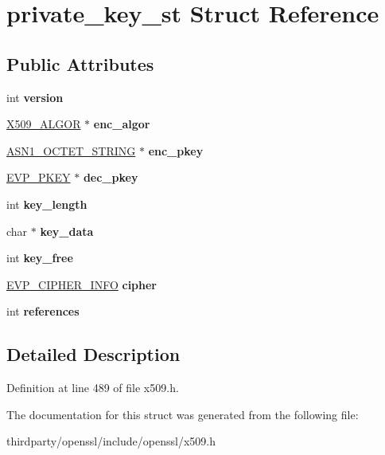 \hypertarget{structprivate__key__st}{}\section{private\+\_\+key\+\_\+st Struct Reference}
\label{structprivate__key__st}
\subsection*{Public Attributes}
\begin{DoxyCompactItemize}
\item 
\mbox{\label{structprivate__key__st_a16bd44f055e649572a0f5b0d62a92219}} 
int {\bfseries version}
\item 
\mbox{\label{structprivate__key__st_a866f6478e044bb225e3c9983df4b48a2}} 
\hyperlink{struct_x509__algor__st}{X509\+\_\+\+A\+L\+G\+OR} $\ast$ {\bfseries enc\+\_\+algor}
\item 
\mbox{\label{structprivate__key__st_a514cc301684203bf755bbc83033f51aa}} 
\hyperlink{structasn1__string__st}{A\+S\+N1\+\_\+\+O\+C\+T\+E\+T\+\_\+\+S\+T\+R\+I\+NG} $\ast$ {\bfseries enc\+\_\+pkey}
\item 
\mbox{\label{structprivate__key__st_ab6fa39f8beba82366b4a0c9af1d68231}} 
\hyperlink{structevp__pkey__st}{E\+V\+P\+\_\+\+P\+K\+EY} $\ast$ {\bfseries dec\+\_\+pkey}
\item 
\mbox{\label{structprivate__key__st_a4fd59ffeb31b0bc4acf1330ba4c1cfab}} 
int {\bfseries key\+\_\+length}
\item 
\mbox{\label{structprivate__key__st_a648ff8dfa3759f8cf7e78e8f0acf621e}} 
char $\ast$ {\bfseries key\+\_\+data}
\item 
\mbox{\label{structprivate__key__st_a6cba7d7973cf8425493d996dd8464e29}} 
int {\bfseries key\+\_\+free}
\item 
\mbox{\label{structprivate__key__st_afeef179b98e87f1f950eb977dda61fc4}} 
\hyperlink{structevp__cipher__info__st}{E\+V\+P\+\_\+\+C\+I\+P\+H\+E\+R\+\_\+\+I\+N\+FO} {\bfseries cipher}
\item 
\mbox{\label{structprivate__key__st_a96a0fec0281fed6acf1d455f2d5c93ff}} 
int {\bfseries references}
\end{DoxyCompactItemize}


\subsection{Detailed Description}


Definition at line 489 of file x509.\+h.



The documentation for this struct was generated from the following file\+:\begin{DoxyCompactItemize}
\item 
thirdparty/openssl/include/openssl/x509.\+h\end{DoxyCompactItemize}
